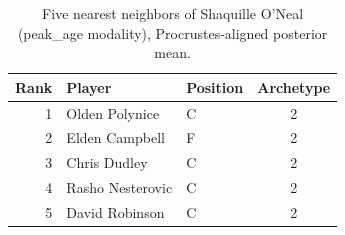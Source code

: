 \begin{table}[htbp]
  \centering\small
  \begin{tabular}{rllc}
    \toprule
    Rank & Player & Position & Archetype \\
    \midrule
    1 & Olden Polynice & C & 2 \\
    2 & Elden Campbell & F & 2 \\
    3 & Chris Dudley & C & 2 \\
    4 & Rasho Nesterovic & C & 2 \\
    5 & David Robinson & C & 2 \\
    \bottomrule
  \end{tabular}
  \caption{Five nearest neighbors of Shaquille O'Neal (peak_age modality), Procrustes-aligned posterior mean.}
  \label{tab:Shaquille_O_Neal_neighbors_peak_age}
\end{table}

